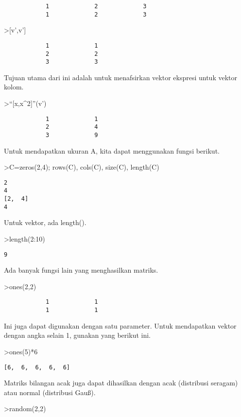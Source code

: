 \documentclass[
]{book}
\begin{document}
\begin{verbatim}
            1             2             3 
            1             2             3 
\end{verbatim}

\textgreater{[}v',v'{]}

\begin{verbatim}
            1             1 
            2             2 
            3             3 
\end{verbatim}

Tujuan utama dari ini adalah untuk menafsirkan vektor ekspresi untuk vektor kolom.

\textgreater{}``{[}x,x\^{}2{]}''(v')

\begin{verbatim}
            1             1 
            2             4 
            3             9 
\end{verbatim}

Untuk mendapatkan ukuran A, kita dapat menggunakan fungsi berikut.

\textgreater C=zeros(2,4); rows(C), cols(C), size(C), length(C)

\begin{verbatim}
2
4
[2,  4]
4
\end{verbatim}

Untuk vektor, ada length().

\textgreater length(2:10)

\begin{verbatim}
9
\end{verbatim}

Ada banyak fungsi lain yang menghasilkan matriks.

\textgreater ones(2,2)

\begin{verbatim}
            1             1 
            1             1 
\end{verbatim}

Ini juga dapat digunakan dengan satu parameter. Untuk mendapatkan vektor dengan angka selain 1, gunakan yang berikut ini.

\textgreater ones(5)*6

\begin{verbatim}
[6,  6,  6,  6,  6]
\end{verbatim}

Matriks bilangan acak juga dapat dihasilkan dengan acak (distribusi seragam) atau normal (distribusi Gauß).

\textgreater random(2,2)
\end{document}
